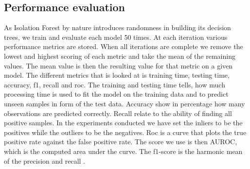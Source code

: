 \subsection{Performance evaluation}
As Isolation Forest by nature introduces randomness in building its decision trees, we train and evaluate each model 50 times. At each iteration various performance metrics are stored. When all iterations are complete we remove the lowest and highest scoring of each metric and take the mean of the remaining values. The mean value is then the resulting value for that metric on a given model. The different metrics that is looked at is training time, testing time, accuracy, f1, recall and roc. The training and testing time tells, how much processing time is used to fit the model on the training data and to predict unseen samples in form of the test data. Accuracy show in percentage how many observations are predicted correctly. Recall relate to the ability of finding all positive samples. In the experiments conducted we have set the inliers to be the positives while the outliers to be the negatives. Roc is a curve that plots the true positive rate against the false positive rate. The score we use is then AUROC, which is the computed area under the curve. The f1-score is the harmonic mean of the precision and recall \cite{sklearn}.                 



